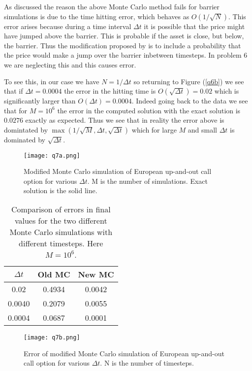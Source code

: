 \documentclass[10pt,english]{article}
\theoremstyle{plain}
\newcommand{\dt}{\Delta t}
\begin{document}
\begin{enumerate}
As discussed \cite{Moon} the reason the above Monte Carlo method fails for barrier simulations is due to the time hitting error, which behaves as $O(1/\sqrt{N})$. This error arises because during a time interval $\dt$ it is possible that the price might have jumped above the barrier. This is probable if the asset is close, but below, the barrier. Thus the modification proposed by \cite{Moon} is to include a probability that the price would make a jump over the barrier inbetween timesteps. In problem 6 we are neglecting this and this causes error.

To see this, in our case we have $N=1/\dt$ so returning to Figure (\ref{q6b}) we see that if $\dt=0.0004$ the error in the hitting time is $O(\sqrt{\dt})=0.02$ which is significantly larger than $O(\dt)=0.0004$. Indeed going back to the data we see that for $M=10^{6}$ the error in the computed solution with the exact solution is $0.0276$ exactly as expected. Thus we see that in reality the error above is domintated by $\max(1/\sqrt{M},\dt,\sqrt{\dt})$ which for large $M$ and small $\dt$ is dominated by $\sqrt{\dt}$. 

\begin{figure}
\begin{center}
\texttt{[image: q7a.png]}
\end{center}
\caption{Modified Monte Carlo simulation of European up-and-out call option for various $\dt$. M is the number of simulations. Exact solution is the solid line.}\label{q7a}
\end{figure}
\begin{table}
\centering
\begin{tabular}{|c|c|c|}
\hline
  $\dt$ & Old MC & New MC \\
\hline
  0.02 &  0.4934 & 0.0042\\
  0.0040 &  0.2079 & 0.0055\\
  0.0004  &  0.0687 & 0.0001\\
\hline
\end{tabular}
\caption{Comparison of errors in final values for the two different Monte Carlo simulations with different timesteps. Here $M=10^{6}$.}
\end{table}
\begin{figure}
\begin{center}
\texttt{[image: q7b.png]}
\end{center}
\caption{Error of modified Monte Carlo simulation of European up-and-out call option for various $\dt$. N is the number of timesteps.}\label{q7b}
\end{figure}


\end{enumerate}
\end{document}
